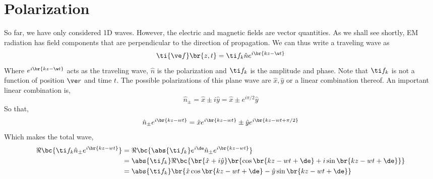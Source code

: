 \documentclass{article}
\begin{document}
\section{Polarization}
So far, we have only considered 1D waves. However, the electric and magnetic fields are vector quantities. As we shall see shortly, EM radiation has field components that are perpendicular to the direction of propagation. We can thus write a traveling wave as
\[ \ti {\ve f}\br{z, t} = \ti f_{k} \hat n e^{i\br{kz - \w t}} \]
Where $e^{i\br{kz - \w t}}$ acts as the traveling wave, $\hat n$ is the polarization and $\ti f_{k}$ is the amplitude and phase. Note that $\ti f_{k}$ is not a function of position $\ve r$ and time $t$. The possible polarizations of this plane wave are $\hat x, \hat y$ or a linear combination thereof. An important linear combination is,
\[ \hat n_{\pm} = \hat x \pm i \hat y = \hat x \pm e^{i \pi / 2} \hat y \]
So that,
\[ \hat n_{\pm} e^{i\br{kz - wt}} = \hat x e^{i\br{kz - wt}} \pm \hat y e^{i\br{kz - wt + \pi/2}}\]
Which makes the total wave,
\begin{align*}
\Re\bc{\ti f_{k}\hat n_{\pm} e^{i\br{kz - wt}}}
&= \Re\bc{\abs{\ti f_{k}} e^{i \de} \hat n_{\pm} e^{i\br{kz - wt}}} \\
&= \abs{\ti f_{k}}\Re\bc{\br{\hat x + i \hat y} \br{\cos \br{kz - wt + \de} + i\sin \br{kz - wt + \de}}} \\
&= \abs{\ti f_{k}}\br{\hat x \cos \br{kz - wt + \de} - \hat y\sin \br{kz - wt + \de}} \\
\end{align*}

\begin{center}
\end{center}
\end{document}
